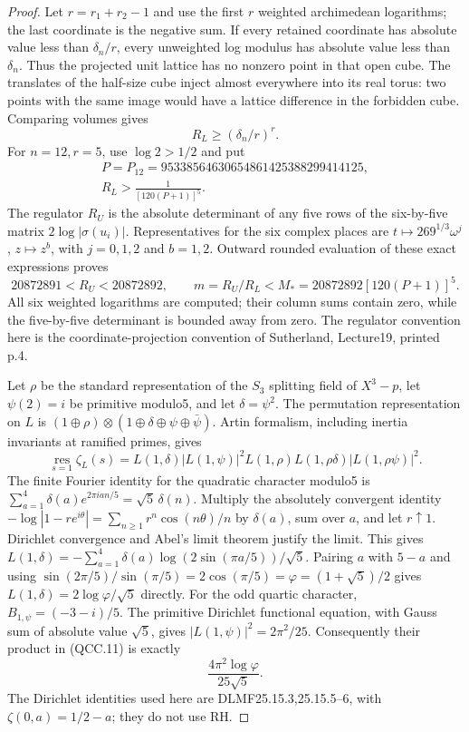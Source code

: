 \begin{proof}
Let $r=r_1+r_2-1$ and use the first $r$ weighted archimedean logarithms;
the last coordinate is the negative sum.  If every retained coordinate
has absolute value less than $\delta_n/r$, every unweighted log modulus
has absolute value less than $\delta_n$.  Thus the projected unit
lattice has no nonzero point in that open cube.  The translates of
the half-size cube inject almost everywhere into its real torus:
two points with the same image would have a lattice difference in
the forbidden cube.  Comparing volumes gives
\[
 R_L\ge(\delta_n/r)^r.
 \tag{QCC.8}
\]
For $n=12,r=5$, use $\log2>1/2$ and put
\[
 \begin{gathered}
 P=P_{12}=95338564630654861425388299414125,\\
 R_L>\frac1{[120(P+1)]^5}.
 \end{gathered}
 \tag{QCC.9}
\]
The regulator $R_U$ is the absolute determinant of any five rows of
the six-by-five matrix $2\log|\sigma(u_i)|$.  Representatives for the
six complex places are $t\mapsto269^{1/3}\omega^j$, $z\mapsto z^b$,
with $j=0,1,2$ and $b=1,2$.  Outward rounded evaluation of these exact
expressions proves
\[
 20872891<R_U<20872892,\qquad
 m=R_U/R_L< M_*=20872892[120(P+1)]^5.
 \tag{QCC.10}
\]
All six weighted logarithms are computed; their column sums contain
zero, while the five-by-five determinant is bounded away from zero.
The regulator convention here is the coordinate-projection convention
of Sutherland, Lecture19, printed p.4.

Let $\rho$ be the standard representation of the $S_3$ splitting
field of $X^3-p$, let $\psi(2)=i$ be primitive modulo5, and let
$\delta=\psi^2$.  The permutation representation on $L$ is
$(1\oplus\rho)\otimes(1\oplus\delta\oplus\psi\oplus\bar\psi)$.
Artin formalism, including inertia invariants at ramified primes,
gives
\[
 \operatorname*{res}_{s=1}\zeta_L(s)
 =L(1,\delta)|L(1,\psi)|^2
   L(1,\rho)L(1,\rho\delta)|L(1,\rho\psi)|^2.
 \tag{QCC.11}
\]
The finite Fourier identity for the quadratic character modulo5 is
$\sum_{a=1}^4\delta(a)e^{2\pi i an/5}=\sqrt5\,\delta(n)$.
Multiply the absolutely convergent identity
$-\log|1-re^{i\theta}|=\sum_{n\ge1}r^n\cos(n\theta)/n$
by $\delta(a)$, sum over $a$, and let $r\uparrow1$.
Dirichlet convergence and Abel's limit theorem justify the limit.
This gives
$L(1,\delta)=-\sum_{a=1}^4\delta(a)\log(2\sin(\pi a/5))/\sqrt5$.
Pairing $a$ with $5-a$ and using
$\sin(2\pi/5)/\sin(\pi/5)=2\cos(\pi/5)=\varphi=(1+\sqrt5)/2$
gives $L(1,\delta)=2\log\varphi/\sqrt5$ directly.
For the odd quartic character, $B_{1,\psi}=(-3-i)/5$.
The primitive Dirichlet functional equation, with Gauss sum of
absolute value $\sqrt5$, gives $|L(1,\psi)|^2=2\pi^2/25$.
Consequently their product in (QCC.11) is exactly
\[
                 \frac{4\pi^2\log\varphi}{25\sqrt5}.
 \tag{QCC.12}
\]
The Dirichlet identities used here are DLMF25.15.3,25.15.5--6,
with $\zeta(0,a)=1/2-a$; they do not use RH.


\end{proof}
